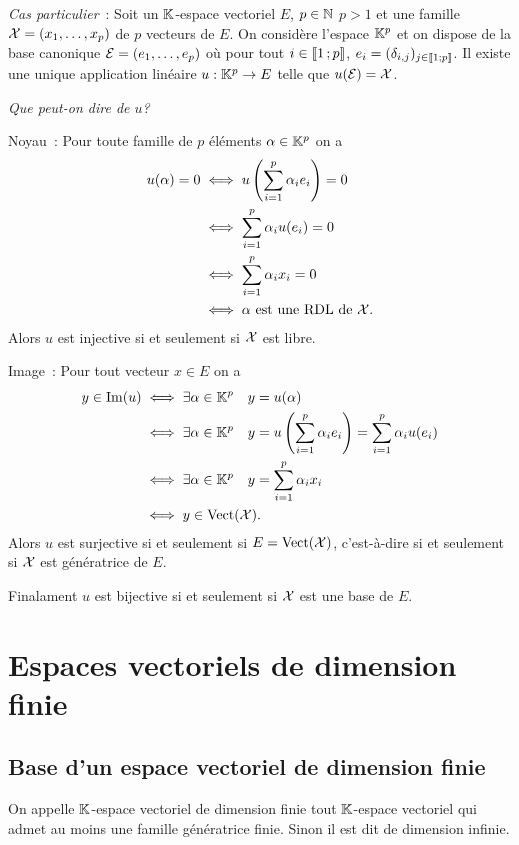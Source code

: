 \emph{Cas particulier}~: Soit un \(\mathbb{K}\)-espace vectoriel \(E\), \(p \in \mathbb{N}\) \(p>1\) et une famille \(\mathcal{X}=(x_1, \ldots, x_p)\) de \(p\) vecteurs de \(E\). On considère l'espace \(\mathbb{K}^p\) et on dispose de la base canonique \(\mathcal{E}=(e_1, \ldots, e_p)\) où pour tout \(i \in \mathopen{\llbracket}1\mathclose{}\mathpunct{};p\mathclose{\rrbracket}\), \(e_i = (\delta_{i,j})_{j \in \mathopen{\llbracket}1\mathclose{}\mathpunct{};p\mathclose{\rrbracket}}\). Il existe une unique application linéaire \(u : \mathbb{K}^p \rightarrow E\) telle que \(u(\mathcal{E})=\mathcal{X}\).

\emph{Que peut-on dire de \(u\)?}

Noyau~: Pour toute famille de \(p\) éléments \(\alpha \in \mathbb{K}^p\) on a
\begin{align}
  u(\alpha)=0 &\iff u\left(\sum_{i=1}^p \alpha_i e_i \right)=0\\
  &\iff \sum_{i=1}^p \alpha_i u(e_i) =0\\
  &\iff \sum_{i=1}^p \alpha_i x_i =0\\
  &\iff \alpha \text{~est une RDL de } \mathcal{X}.
\end{align}
Alors \(u\) est injective si et seulement si \(\mathcal{X}\) est libre.

Image~: Pour tout vecteur \(x \in E\) on a
\begin{align}
  y \in \operatorname{Im}(u) &\iff \exists \alpha \in \mathbb{K}^p \quad y=u(\alpha)\\
  &\iff \exists \alpha \in \mathbb{K}^p \quad y=u\left(\sum_{i=1}^p \alpha_i e_i \right)= \sum_{i=1}^p \alpha_i u(e_i) \\
  &\iff \exists \alpha \in \mathbb{K}^p \quad y=\sum_{i=1}^p \alpha_i x_i\\
  &\iff y \in \operatorname{Vect}(\mathcal{X}).
\end{align}
Alors \(u\) est surjective si et seulement si \(E=\operatorname{Vect}(\mathcal{X})\), c'est-à-dire si et seulement si \(\mathcal{X}\) est génératrice de \(E\).

Finalament \(u\) est bijective si et seulement si \(\mathcal{X}\) est une base de \(E\).

\section{Espaces vectoriels de dimension finie}

\subsection{Base d'un espace vectoriel de dimension finie}

\begin{defdef}
  On appelle \(\mathbb{K}\)-espace vectoriel de dimension finie tout \(\mathbb{K}\)-espace vectoriel qui admet au moins une famille génératrice finie. Sinon il est dit de dimension infinie.
\end{defdef}

